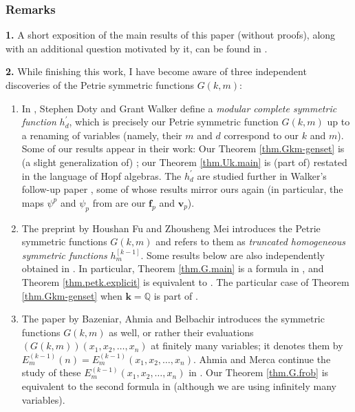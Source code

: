 \documentclass[numbers=enddot,12pt,final,onecolumn,notitlepage]{scrartcl}%
\theoremstyle{definition}
\begin{document}
\subsubsection*{Remarks}

\textbf{1.} A short exposition of the main results of this paper (without
proofs), along with an additional question motivated by it, can be found in
\cite{Grinbe20}.

\textbf{2.} While finishing this work, I have become aware of three
independent discoveries of the Petrie symmetric functions $G\left(
k,m\right)  $:

\begin{enumerate}
\item[\textbf{(a)}] In \cite[\S 3.3]{DotWal92}, Stephen Doty and Grant Walker
define a \emph{modular complete symmetric function }$h_{d}^{\prime}$, which is
precisely our Petrie symmetric function $G\left(  k,m\right)  $ up to a
renaming of variables (namely, their $m$ and $d$ correspond to our $k$ and
$m$). Some of our results appear in their work: Our Theorem
\ref{thm.Gkm-genset} is (a slight generalization of) \cite[Corollary
3.9]{DotWal92}; our Theorem \ref{thm.Uk.main} is (part of) \cite[Proposition
3.15]{DotWal92} restated in the language of Hopf algebras. The $h_{d}^{\prime
}$ are studied further in Walker's follow-up paper \cite{Walker94}, some of
whose results mirror ours again (in particular, the maps $\psi^{p}$ and
$\psi_{p}$ from \cite{Walker94} are our $\mathbf{f}_{p}$ and $\mathbf{v}_{p}$).

\item[\textbf{(b)}] The preprint \cite{FuMei20} by Houshan Fu and Zhousheng
Mei introduces the Petrie symmetric functions $G\left(  k,m\right)  $ and
refers to them as \emph{truncated homogeneous symmetric functions}
$h_{m}^{\left[  k-1\right]  }$. Some results below are also independently
obtained in \cite{FuMei20}. In particular, Theorem \ref{thm.G.main} is a
formula in \cite[\S 2]{FuMei20}, and Theorem \ref{thm.petk.explicit} is
equivalent to \cite[Proposition 2.9]{FuMei20}. The particular case of Theorem
\ref{thm.Gkm-genset} when $\mathbf{k}=\mathbb{Q}$ is part of \cite[Theorem
2.7]{FuMei20}.

\item[\textbf{(c)}] The paper \cite{BaAhBe18} by Bazeniar, Ahmia and Belbachir
introduces the symmetric functions $G\left(  k,m\right)  $ as well, or rather
their evaluations $\left(  G\left(  k,m\right)  \right)  \left(  x_{1}%
,x_{2},\ldots,x_{n}\right)  $ at finitely many variables; it denotes them by
$E_{m}^{\left(  k-1\right)  }\left(  n\right)  =E_{m}^{\left(  k-1\right)
}\left(  x_{1},x_{2},\ldots,x_{n}\right)  $. Ahmia and Merca continue the
study of these $E_{m}^{\left(  k-1\right)  }\left(  x_{1},x_{2},\ldots
,x_{n}\right)  $ in \cite{AhmMer20}. Our Theorem \ref{thm.G.frob} is
equivalent to the second formula in \cite[Theorem 3.3]{AhmMer20} (although we
are using infinitely many variables).


\end{enumerate}
\end{document}
